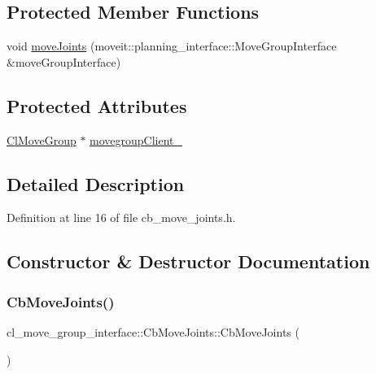 \subsection*{Protected Member Functions}
\begin{DoxyCompactItemize}
\item 
void \hyperlink{classcl__move__group__interface_1_1CbMoveJoints_ad91d243eb8a818e240d85e5a7fdea68d}{move\+Joints} (moveit\+::planning\+\_\+interface\+::\+Move\+Group\+Interface \&move\+Group\+Interface)
\end{DoxyCompactItemize}
\subsection*{Protected Attributes}
\begin{DoxyCompactItemize}
\item 
\hyperlink{classcl__move__group__interface_1_1ClMoveGroup}{Cl\+Move\+Group} $\ast$ \hyperlink{classcl__move__group__interface_1_1CbMoveJoints_aa5749bbc6bb5f09069e9e8115326f024}{movegroup\+Client\+\_\+}
\end{DoxyCompactItemize}


\subsection{Detailed Description}


Definition at line 16 of file cb\+\_\+move\+\_\+joints.\+h.



\subsection{Constructor \& Destructor Documentation}
\mbox{\label{classcl__move__group__interface_1_1CbMoveJoints_a085919fd766e50098cbe9782de3303c6}} 
\subsubsection{\texorpdfstring{Cb\+Move\+Joints()}{CbMoveJoints()}\hspace{0.1cm}{\footnotesize\ttfamily [1/2]}}
{\footnotesize\ttfamily cl\+\_\+move\+\_\+group\+\_\+interface\+::\+Cb\+Move\+Joints\+::\+Cb\+Move\+Joints (\begin{DoxyParamCaption}{ }\end{DoxyParamCaption})}



